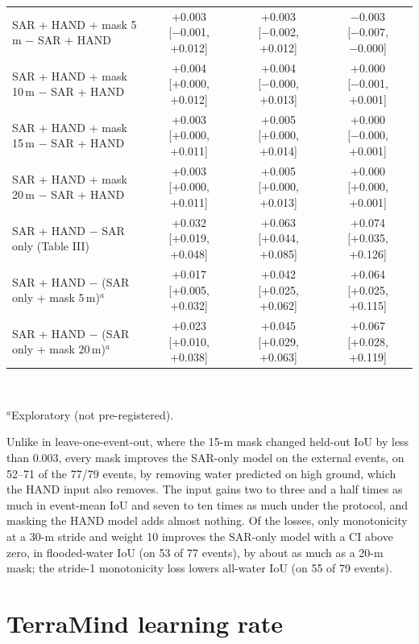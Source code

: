 \documentclass[journal,onecolumn]{IEEEtran}
\begin{document}
\begin{table}[H]
{\begin{tabular}{@{}lccc@{}}
SAR + HAND + mask 5\,m − SAR + HAND & +0.003 [−0.001, +0.012] & +0.003 [−0.002, +0.012] & −0.003 [−0.007, −0.000] \\
SAR + HAND + mask 10\,m − SAR + HAND & +0.004 [+0.000, +0.012] & +0.004 [−0.000, +0.013] & +0.000 [−0.001, +0.001] \\
SAR + HAND + mask 15\,m − SAR + HAND & +0.003 [+0.000, +0.011] & +0.005 [+0.000, +0.014] & +0.000 [−0.000, +0.001] \\
SAR + HAND + mask 20\,m − SAR + HAND & +0.003 [+0.000, +0.011] & +0.005 [+0.000, +0.013] & +0.000 [+0.000, +0.001] \\
\midrule
SAR + HAND − SAR only (Table III) & +0.032 [+0.019, +0.048] & +0.063 [+0.044, +0.085] & +0.074 [+0.035, +0.126] \\
SAR + HAND − (SAR only + mask 5\,m)$^a$ & +0.017 [+0.005, +0.032] & +0.042 [+0.025, +0.062] & +0.064 [+0.025, +0.115] \\
SAR + HAND − (SAR only + mask 20\,m)$^a$ & +0.023 [+0.010, +0.038] & +0.045 [+0.029, +0.063] & +0.067 [+0.028, +0.119] \\
\bottomrule
\end{tabular}}
\\[2pt]\raggedright\footnotesize $^a$Exploratory (not pre-registered).
\end{table}

Unlike in leave-one-event-out, where the 15-m mask changed held-out IoU by less than 0.003, every mask
improves the SAR-only model on the external events, on 52--71 of the 77/79 events, by removing water
predicted on high ground, which the HAND input also removes. The input gains two to three and a half times as much in
event-mean IoU and seven to ten times as much under the protocol, and masking the HAND model adds almost
nothing. Of the losses, only monotonicity at a 30-m stride and weight 10 improves the SAR-only model with a
CI above zero, in flooded-water IoU (on 53 of 77 events), by about as much as a 20-m mask; the stride-1
monotonicity loss lowers all-water IoU (on 55 of 79 events).

\section*{TerraMind learning rate}
\end{document}
